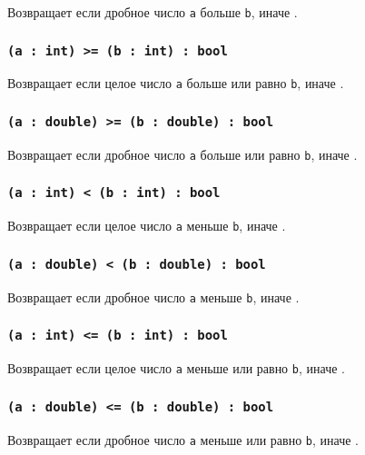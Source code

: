 Возвращает \true{} если дробное число \texttt{a} больше \texttt{b}, иначе \false{}.

\subsubsection{\texttt{(a : int) >= (b : int) : bool}}

Возвращает \true{} если целое число \texttt{a} больше или равно \texttt{b}, иначе \false{}.

\subsubsection{\texttt{(a : double) >= (b : double) : bool}}

Возвращает \true{} если дробное число \texttt{a} больше или равно \texttt{b}, иначе \false{}.

\subsubsection{\texttt{(a : int) < (b : int) : bool}}

Возвращает \true{} если целое число \texttt{a} меньше \texttt{b}, иначе \false{}.

\subsubsection{\texttt{(a : double) < (b : double) : bool}}

Возвращает \true{} если дробное число \texttt{a} меньше \texttt{b}, иначе \false{}.

\subsubsection{\texttt{(a : int) <= (b : int) : bool}}

Возвращает \true{} если целое число \texttt{a} меньше или равно \texttt{b}, иначе \false{}.

\subsubsection{\texttt{(a : double) <= (b : double) : bool}}

Возвращает \true{} если дробное число \texttt{a} меньше или равно \texttt{b}, иначе \false{}.

